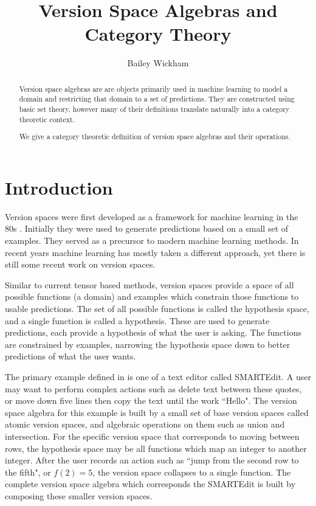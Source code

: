 \documentclass{article}
\title{Version Space Algebras and Category Theory}
\author{Bailey Wickham}
\theoremstyle{definition}
\begin{document}
\maketitle

\begin{abstract}
Version space algebras are are objects primarily used in machine learning to model a domain and restricting that domain to a set of predictions. They are constructed using basic set theory, however many of their definitions translate naturally into a category theoretic context. 

We give a category theoretic definition of version space algebras and their operations. 
\end{abstract}

\section{Introduction}
Version spaces were first developed as a framework for machine learning in the 80s \cite{original}. Initially they were used to generate predictions based on a small set of examples. They served as a precursor to modern machine learning methods. In recent years machine learning has mostly taken a different approach, yet there is still some recent work on version spaces. 

Similar to current tensor based methods, version spaces provide a space of all possible functions (a domain) and examples which constrain those functions to usable predictions. The set of all possible functions is called the hypothesis space, and a single function is called a hypothesis. These are used to generate predictions, each provide a hypothesis of what the user is asking. The functions are constrained by examples, narrowing the hypothesis space down to better predictions of what the user wants.

The primary example defined in \cite{short} is one of a text editor called SMARTEdit. A user may want to perform complex actions such as delete text between these quotes, or move down five lines then copy the text until the work ``Hello". The version space algebra for this example is built by a small set of base version spaces called atomic version spaces, and algebraic operations on them such as union and intersection. For the specific version space that corresponds to moving between rows, the hypothesis space may be all functions which map an integer to another integer. After the user records an action such as ``jump from the second row to the fifth", or $f(2) = 5$, the version space collapses to a single function. The complete version space algebra which corresponds the SMARTEdit is built by composing these smaller version spaces.
\end{document}
